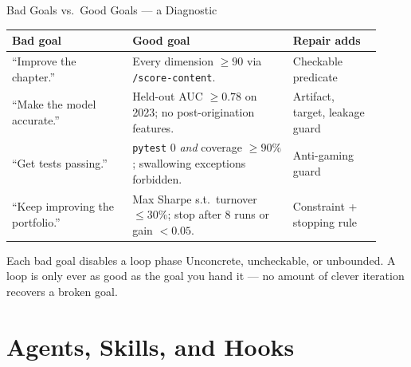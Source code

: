 \documentclass[9pt,t]{beamer}
\begin{document}
\begin{frame}{Bad Goals vs.\ Good Goals --- a Diagnostic}

\begin{tabular}{@{}p{0.30\linewidth}p{0.40\linewidth}p{0.22\linewidth}@{}}
\toprule
\textbf{Bad goal} & \textbf{Good goal} & \textbf{Repair adds} \\
\midrule
``Improve the chapter.'' & Every dimension $\geq 90$ via \texttt{/score-content}.
& Checkable predicate \\
\addlinespace
``Make the model accurate.'' & Held-out AUC $\geq 0.78$ on 2023; no
post-origination features. & Artifact, target, leakage guard \\
\addlinespace
``Get tests passing.'' & \texttt{pytest} 0 \emph{and} coverage $\geq 90\%$;
swallowing exceptions forbidden. & Anti-gaming guard \\
\addlinespace
``Keep improving the portfolio.'' & Max Sharpe s.t.\ turnover $\leq 30\%$; stop
after 8 runs or gain $< 0.05$. & Constraint + stopping rule \\
\bottomrule
\end{tabular}

\medskip
\begin{alertblock}{Each bad goal disables a loop phase}
Unconcrete, uncheckable, or unbounded. \alert{A loop is only ever as good as the
goal you hand it} --- no amount of clever iteration recovers a broken goal.
\end{alertblock}
\end{frame}

\section{Agents, Skills, and Hooks}
\end{document}

